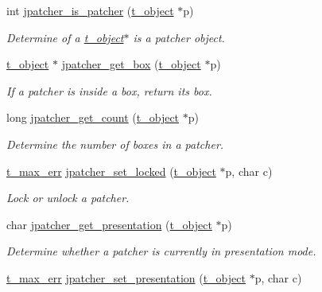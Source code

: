 \begin{DoxyCompactItemize}
\item 
int \hyperlink{group__jpatcher_ga7ffe181b1eaf48f2380c22b6483037af}{jpatcher\_\-is\_\-patcher} (\hyperlink{structt__object}{t\_\-object} $\ast$p)
\begin{DoxyCompactList}\small\item\em Determine of a \hyperlink{structt__object}{t\_\-object}$\ast$ is a patcher object. \item\end{DoxyCompactList}\item 
\hyperlink{structt__object}{t\_\-object} $\ast$ \hyperlink{group__jpatcher_gad55371f057913b8b26cb58c3c517a1f4}{jpatcher\_\-get\_\-box} (\hyperlink{structt__object}{t\_\-object} $\ast$p)
\begin{DoxyCompactList}\small\item\em If a patcher is inside a box, return its box. \item\end{DoxyCompactList}\item 
long \hyperlink{group__jpatcher_gaf5a44f30054baae18b5019f305070612}{jpatcher\_\-get\_\-count} (\hyperlink{structt__object}{t\_\-object} $\ast$p)
\begin{DoxyCompactList}\small\item\em Determine the number of boxes in a patcher. \item\end{DoxyCompactList}\item 
\hyperlink{group__datatypes_ga73edaae82b318855cc09fac994918165}{t\_\-max\_\-err} \hyperlink{group__jpatcher_ga3210a517b3c79b2fb305b9a8357fe3db}{jpatcher\_\-set\_\-locked} (\hyperlink{structt__object}{t\_\-object} $\ast$p, char c)
\begin{DoxyCompactList}\small\item\em Lock or unlock a patcher. \item\end{DoxyCompactList}\item 
char \hyperlink{group__jpatcher_gaa3af83f31fba548f05ac23e5f4144ed9}{jpatcher\_\-get\_\-presentation} (\hyperlink{structt__object}{t\_\-object} $\ast$p)
\begin{DoxyCompactList}\small\item\em Determine whether a patcher is currently in presentation mode. \item\end{DoxyCompactList}\item 
\hyperlink{group__datatypes_ga73edaae82b318855cc09fac994918165}{t\_\-max\_\-err} \hyperlink{group__jpatcher_ga3994f39cf34c6a1f4502e087ad6adb0a}{jpatcher\_\-set\_\-presentation} (\hyperlink{structt__object}{t\_\-object} $\ast$p, char c)

\end{DoxyCompactItemize}
